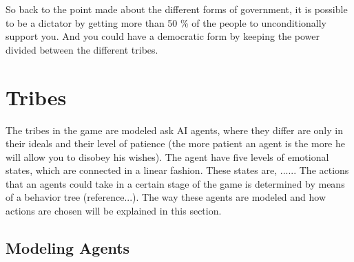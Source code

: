 \documentclass[11pt,a4paper]{article}
\begin{document}
So back to the point made about the different forms of government, it is possible to be a dictator by getting more than 50 \% of the people to unconditionally support you. And you could have a democratic form by keeping the power divided between the different tribes.

\section{Tribes}
The tribes in the game are modeled ask AI agents, where they differ are only in their ideals and their level of patience (the more patient an agent is the more he will allow you to disobey his wishes). The agent have five levels of emotional states, which are connected in a linear fashion. These states are, ...... The actions that an agents could take in a certain stage of the game is determined by means of a behavior tree (reference...). The way these agents are modeled and how actions are chosen will be explained in this section. 

\subsection{Modeling Agents}
\end{document}
